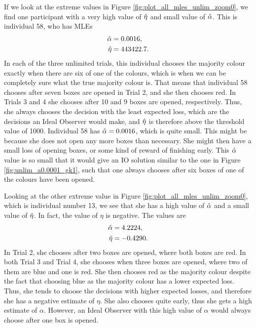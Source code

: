  
If we look at the extreme values in Figure \ref{fig:plot_all_mles_unlim_zoom0}, we find one participant with a very high value of $\hat{\eta}$ and small value of $\hat{\alpha}$. This is individual 58, who has MLEs
\begin{equation}
\label{mles_unlim_person58}
    \begin{aligned}
        \hat{\alpha} &= 0.0016,\\
        \hat{\eta} &= 443422.7.
    \end{aligned}
\end{equation}
In each of the three unlimited trials, this individual chooses the majority colour exactly when there are six of one of the colours, which is when we can be completely sure what the true majority colour is. That means that individual 58 chooses after seven boxes are opened in Trial 2, and she then chooses red. In Trials 3 and 4 she chooses after 10 and 9 boxes are opened, respectively. Thus, she always chooses the decision with the least expected loss, which are the decisions an Ideal Observer would make, and $\hat{\eta}$ is therefore above the threshold value of 1000. Individual 58 has $\hat{\alpha}=0.0016$, which is quite small. This might be because she does not open any more boxes than necessary. She might then have a small loss of opening boxes, or some kind of reward of finishing early. This $\hat{\alpha}$ value is so small that it would give an IO solution similar to the one in Figure \ref{fig:unlim_a0.0001_gk1}, such that one always chooses after six boxes of one of the colours have been opened. 

Looking at the other extreme value in Figure \ref{fig:plot_all_mles_unlim_zoom0}, which is individual number 13, we see that she has a high value of $\hat{\alpha}$ and a small value of $\hat{\eta}$. In fact, the value of $\eta$ is negative. The values are
\begin{equation}
\label{mles_unlim_person13}
    \begin{aligned}
        \hat{\alpha} &= 4.2224,\\
        \hat{\eta} &= -0.4290.
    \end{aligned}
\end{equation}
In Trial 2, she chooses after two boxes are opened, where both boxes are red. In both Trial 3 and Trial 4, she chooses when three boxes are opened, where two of them are blue and one is red. She then chooses red as the majority colour despite the fact that choosing blue as the majority colour has a lower expected loss. Thus, she tends to choose the decisions with higher expected losses, and therefore she has a negative estimate of $\eta$. She also chooses quite early, thus she gets a high estimate of $\alpha$. However, an Ideal Observer with this high value of $\alpha$ would always choose after one box is opened.

